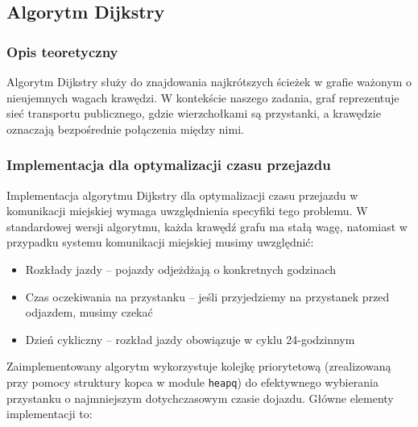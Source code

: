 \documentclass[12pt,a4paper]{article}
\begin{document}
\subsection{Algorytm Dijkstry}
\subsubsection{Opis teoretyczny}
Algorytm Dijkstry służy do znajdowania najkrótszych ścieżek w grafie ważonym o nieujemnych wagach krawędzi. W kontekście naszego zadania, graf reprezentuje sieć transportu publicznego, gdzie wierzchołkami są przystanki, a krawędzie oznaczają bezpośrednie połączenia między nimi.

\subsubsection{Implementacja dla optymalizacji czasu przejazdu}
Implementacja algorytmu Dijkstry dla optymalizacji czasu przejazdu w komunikacji miejskiej wymaga uwzględnienia specyfiki tego problemu. W standardowej wersji algorytmu, każda krawędź grafu ma stałą wagę, natomiast w przypadku systemu komunikacji miejskiej musimy uwzględnić:

\begin{itemize}
    \item Rozkłady jazdy -- pojazdy odjeżdżają o konkretnych godzinach
    \item Czas oczekiwania na przystanku -- jeśli przyjedziemy na przystanek przed odjazdem, musimy czekać
    \item Dzień cykliczny -- rozkład jazdy obowiązuje w cyklu 24-godzinnym
\end{itemize}

Zaimplementowany algorytm wykorzystuje kolejkę priorytetową (zrealizowaną przy pomocy struktury kopca w module \texttt{heapq}) do efektywnego wybierania przystanku o najmniejszym dotychczasowym czasie dojazdu. Główne elementy implementacji to:
\end{document}
